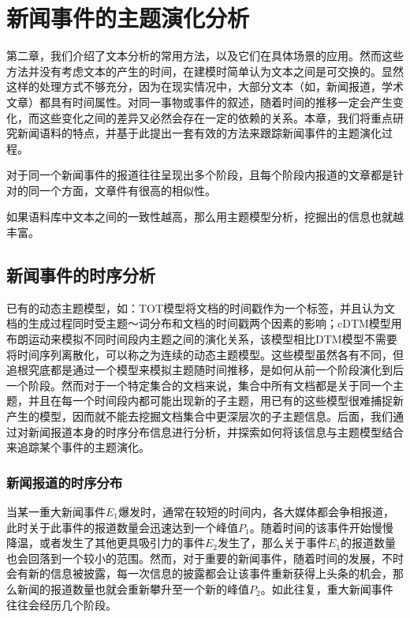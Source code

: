 \chapter{新闻事件的主题演化分析}
第二章，我们介绍了文本分析的常用方法，以及它们在具体场景的应用。然而这些方法并没有考虑文本的产生的时间，在建模时简单认为文本之间是可交换的。显然这样的处理方式不够充分，因为在现实情况中，大部分文本（如，新闻报道，学术文章）都具有时间属性。对同一事物或事件的叙述，随着时间的推移一定会产生变化，而这些变化之间的差异又必然会存在一定的依赖的关系。本章，我们将重点研究新闻语料的特点，并基于此提出一套有效的方法来跟踪新闻事件的主题演化过程。

\begin{assumption}
\label{hyp:newsdistribution}
对于同一个新闻事件的报道往往呈现出多个阶段，且每个阶段内报道的文章都是针对的同一个方面，文章件有很高的相似性。
\end{assumption}

\begin{assumption}
\label{hyp:coherence}
如果语料库中文本之间的一致性越高，那么用主题模型分析，挖掘出的信息也就越丰富。
\end{assumption}

\section{新闻事件的时序分析}
已有的动态主题模型，如：TOT模型\cite{wang2006topics}将文档的时间戳作为一个标签，并且认为文档的生成过程同时受主题～词分布和文档的时间戳两个因素的影响；cDTM模型\cite{wang2008continuous}用布朗运动来模拟不同时间段内主题之间的演化关系，该模型相比DTM模型\cite{blei:2006}不需要将时间序列离散化，可以称之为连续的动态主题模型。这些模型虽然各有不同，但追根究底都是通过一个模型来模拟主题随时间推移，是如何从前一个阶段演化到后一个阶段。然而对于一个特定集合的文档来说，集合中所有文档都是关于同一个主题，并且在每一个时间段内都可能出现新的子主题，用已有的这些模型很难捕捉新产生的模型，因而就不能去挖掘文档集合中更深层次的子主题信息。后面，我们通过对新闻报道本身的时序分布信息进行分析，并探索如何将该信息与主题模型结合来追踪某个事件的主题演化。
\subsection{新闻报道的时序分布}
当某一重大新闻事件$E_1$爆发时，通常在较短的时间内，各大媒体都会争相报道，此时关于此事件的报道数量会迅速达到一个峰值$P_1$。随着时间的该事件开始慢慢降温，或者发生了其他更具吸引力的事件$E_2$发生了，那么关于事件$E_1$的报道数量也会回落到一个较小的范围。然而，对于重要的新闻事件，随着时间的发展，不时会有新的信息被披露，每一次信息的披露都会让该事件重新获得上头条的机会，那么新闻的报道数量也就会重新攀升至一个新的峰值$P_2$。如此往复，重大新闻事件往往会经历几个阶段。

